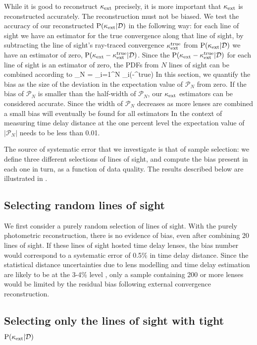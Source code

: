 \documentclass[useAMS,usenatbib]{mn2e}
\begin{document}
While it is good to reconstruct $\kappa_{\rm ext}$ precisely, it is more important that
$\kappa_{\rm ext}$ is reconstructed accurately. The reconstruction must not be biased. 
We test the accuracy of our reconstructed ${\rm P}(\kappa_{\rm ext}|{\mathcal{D}})$ in the following
way: for each line of sight we have an estimator for the true convergence along
that line of sight, by subtracting the line of sight's ray-traced convergence
$\kappa_{\rm ext}^{\rm true}$ from ${\rm P}(\kappa_{\rm ext}|{\mathcal{D}})$ we have an estimator of zero, ${\rm P}(\kappa_{\rm ext}-\kappa_{\rm ext}^{\rm true}|{\mathcal{D}})$.
 Since the ${\rm P}(\kappa_{\rm ext}-\kappa_{\rm ext}^{\rm true}|{\mathcal{D}})$ for
each line of sight is an \independant estimator of zero, the PDFs from $N$ lines of sight
can be combined according to
\be
\label{eq:bias}
_N = \prod_{i=1}^N \pr_i(\kappax-\kappax^{\rm true})
\ee
In this section, we quantify the bias as the size of the deviation in the
expectation value of $\mathcal{P}_N$ from zero. If the bias of $\mathcal{P}_N$
is smaller than the half-width of $\mathcal{P}_N$, our $\kappa_{\rm ext}$ estimators can
be considered accurate. Since the width of $\mathcal{P}_N$ decreases as more
lenses are combined a small bias will eventually be found for all estimators
In the context of measuring time delay distance at the one percent level the
expectation value of $|\mathcal{P}_N|$ needs to be less than 0.01.


The source of systematic error that we investigate is that of sample
selection: we define three different selections of lines of sight, and compute
the bias present in each one in turn, as a function of data quality. The
results described below are illustrated in .


\subsection{Selecting random lines of sight}
\label{sec:bias:random}

We first consider a purely random selection of lines of sight. With the purely
photometric reconstruction, there is no evidence of bias, even after combining 20
lines of sight. If these lines of sight hosted time
delay lenses, the bias number would correspond to a systematic error of
0.5\% in time delay distance. Since the statistical distance uncertainties due
to lens modelling and time delay estimation are likely to be at the 3-4\%
level \citep{SuyuEtal2010},  only a sample containing 200 or more lenses would
be limited by the residual bias  following external convergence
reconstruction.


\subsection{Selecting only the lines of sight with tight ${\rm P}(\kappa_{\rm ext}|{\mathcal{D}})$}
\label{sec:bias:tightPDF}
\end{document}
